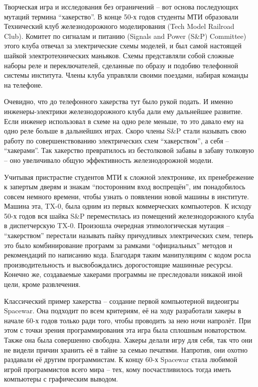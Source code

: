 Творческая игра и исследования без ограничений -- вот основа последующих мутаций термина ``хакерство''. В конце 50-х годов студенты МТИ образовали Технический клуб железнодорожного моделирования (Tech Model Railroad Club). Комитет по сигналам и питанию (Signals and Power (S\&P) Committee) этого клуба отвечал за электрические схемы моделей, и был самой настоящей шайкой электротехнических маньяков. Схемы представляли собой сложные наборы реле и переключателей, сделанные по образу и подобию телефонной системы института. Члены клуба управляли своими поездами, набирая команды на телефоне.

Очевидно, что до телефонного хакерства тут было рукой подать. И именно инженеры-электрики железнодорожного клуба дали ему дальнейшее развитие. Если инженер использовал в схеме на одно реле меньше, то это давало ему на одно реле больше в дальнейших играх. Скоро члены S\&P стали называть свою работу по совершенствованию электрических схем ``хакерством'', а себя -- ``хакерами''. Так хакерство превратилось из бестолковой забавы в забаву толковую -- оно увеличивало общую эффективность железнодорожной модели.

Учитывая пристрастие студентов МТИ к сложной электронике, их пренебрежение к запертым дверям и знакам ``посторонним вход воспрещён'', им понадобилось совсем немного времени, чтобы узнать о появлении новой машины в институте. Машина эта, TX-0, была одним из первых коммерческих компьютеров. К исходу 50-х годов вся шайка S\&P переместилась из помещений железнодорожного клуба в диспетчерскую TX-0. Произошла очередная этимологическая мутация -- ``хакерством'' перестали называть пайку причудливых электрических схем, теперь это было комбинирование программ за рамками ``официальных'' методов и рекомендаций по написанию кода. Благодаря таким манипуляциям с кодом росла производительность и высвобождались дорогостоящие машинные ресурсы. Конечно же, создаваемые хакерами программы не преследовали никакой иной цели, кроме развлечения.

Классический пример хакерства -- создание первой компьютерной видеоигры Spacewar. Она подходит по всем критериям, её на ходу разработали хакеры в начале 60-х годов только ради того, чтобы проводить за нею ночи напролёт. При этом с точки зрения программирования эта игра была сплошным новаторством. Также она была совершенно свободна. Хакеры делали игру для себя, так что они не видели причин хранить её в тайне за семью печатями. Напротив, они охотно раздавали её другим программистам. К концу 60-х Spacewar стала любимой игрой программистов всего мира -- тех, кому посчастливилось тогда иметь компьютеры с графическим выводом.

